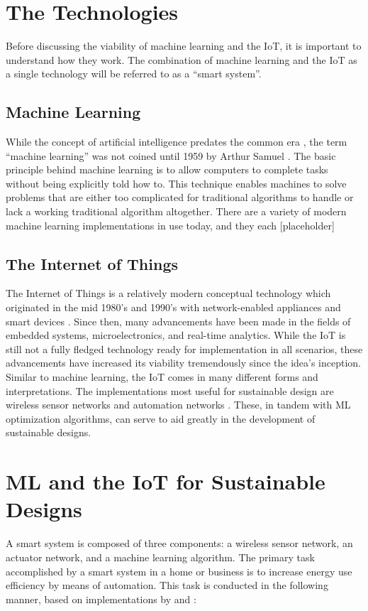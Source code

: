 \documentclass[letterpaper]{article}
\begin{document}
\section{The Technologies} \label{info}
Before discussing the viability of machine learning and the IoT, it is important to understand how they work. The combination of machine learning and the IoT as a single technology will be referred to as a ``smart system''.

\subsection{Machine Learning} \label{MLinfo}
While the concept of artificial intelligence predates the common era \cite{mccorduck04}, the term ``machine learning'' was not coined until 1959 by Arthur Samuel \cite{samuel59}. The basic principle behind machine learning is to allow computers to complete tasks without being explicitly told how to. This technique enables machines to solve problems that are either too complicated for traditional algorithms to handle or lack a working traditional algorithm altogether. There are a variety of modern machine learning implementations in use today, and they each [placeholder]

\subsection{The Internet of Things} \label{IoTinfo}
The Internet of Things is a relatively modern conceptual technology which originated in the mid 1980's and 1990's with network-enabled appliances and smart devices \cite{weiser91}. Since then, many advancements have been made in the fields of embedded systems, microelectronics, and real-time analytics. While the IoT is still not a fully fledged technology ready for implementation in all scenarios, these advancements have increased its viability tremendously since the idea's inception. Similar to machine learning, the IoT comes in many different forms and interpretations. The implementations most useful for sustainable design are wireless sensor networks and automation networks \cite{atzori10}. These, in tandem with ML optimization algorithms, can serve to aid greatly in the development of sustainable designs.

\section{ML and the IoT for Sustainable Designs} \label{main}
A smart system is composed of three components: a wireless sensor network, an actuator network, and a machine learning algorithm. The primary task accomplished by a smart system in a home or business is to increase energy use efficiency by means of automation. This task is conducted in the following manner, based on implementations by \textcite{pang15} and \textcite{risteska17}:
\end{document}
